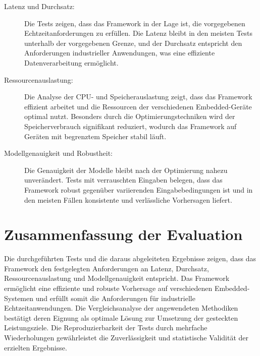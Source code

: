 \begin{description}
    \item[Latenz und Durchsatz:] Die Tests zeigen, dass das Framework in der Lage ist, die vorgegebenen Echtzeitanforderungen zu erfüllen. 
    Die Latenz bleibt in den meisten Tests unterhalb der vorgegebenen Grenze, und der Durchsatz entspricht den Anforderungen industrieller Anwendungen, 
    was eine effiziente Datenverarbeitung ermöglicht.
    
    \item[Ressourcenauslastung:] Die Analyse der CPU- und Speicherauslastung zeigt, dass das Framework effizient arbeitet und die Ressourcen 
    der verschiedenen Embedded-Geräte optimal nutzt. Besonders durch die Optimierungstechniken wird der Speicherverbrauch signifikant reduziert, 
    wodurch das Framework auf Geräten mit begrenztem Speicher stabil läuft.
    
    \item[Modellgenauigkeit und Robustheit:] Die Genauigkeit der Modelle bleibt nach der Optimierung nahezu unverändert. 
    Tests mit verrauschten Eingaben belegen, dass das Framework robust gegenüber variierenden Eingabebedingungen 
    ist und in den meisten Fällen konsistente und verlässliche Vorhersagen liefert.
\end{description}

\section{Zusammenfassung der Evaluation}

Die durchgeführten Tests und die daraus abgeleiteten Ergebnisse zeigen, dass das Framework den festgelegten Anforderungen an Latenz, 
Durchsatz, Ressourcenauslastung und Modellgenauigkeit entspricht. Das Framework ermöglicht eine effiziente und robuste 
Vorhersage auf verschiedenen Embedded-Systemen und erfüllt somit die Anforderungen für industrielle Echtzeitanwendungen. 
Die Vergleichsanalyse der angewendeten Methodiken bestätigt deren Eignung als optimale Lösung zur Umsetzung 
der gesteckten Leistungsziele. Die Reproduzierbarkeit der Tests durch mehrfache Wiederholungen gewährleistet die 
Zuverlässigkeit und statistische Validität der erzielten Ergebnisse.
